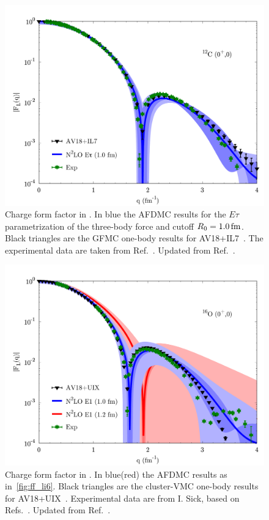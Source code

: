 \documentclass[aps,prc,twocolumn,superscriptaddress,floatfix]{revtex4-1}
\begin{document}
\begin{figure}[htb]
\includegraphics[width=\linewidth]{ff_c12_et.pdf}
\caption[]{Charge form factor in . 
In blue the AFDMC results for the $E\tau$ parametrization of the three-body
force and cutoff $R_0=1.0\,\rm fm$.
Black triangles are the GFMC one-body results for AV18+IL7~\cite{Lovato:2013}.
The experimental data are taken from Ref.~\cite{Devries:1987}.
Updated from Ref.~\cite{Lonardoni:2017afdmc}.}
\label{fig:ff_c12}
\end{figure}

\begin{figure}[htb]
\includegraphics[width=\linewidth]{ff_o16_e1.pdf}
\caption[]{Charge form factor in .
In blue(red) the AFDMC results as in~\cref{fig:ff_li6}.
Black triangles are the cluster-VMC one-body results for AV18+UIX~\cite{Lonardoni:2017cvmc}.
Experimental data are from I. Sick, based on Refs.~\cite{Sick:1970,Schuetz:1975,Sick:1975}.
Updated from Ref.~\cite{Lonardoni:2017afdmc}.}
\label{fig:ff_o16}
\end{figure}
\end{document}
